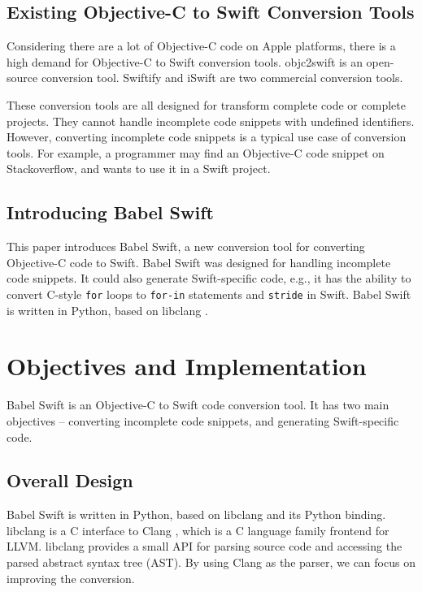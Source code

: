 \documentclass{sfuthesis}
\begin{document}
\section{Existing Objective-C to Swift Conversion Tools}

Considering there are a lot of Objective-C code on Apple platforms, there is a high demand for Objective-C to Swift conversion tools. objc2swift \cite{objc2swift} is an open-source conversion tool. Swiftify \cite{swiftify} and iSwift \cite{iswift} are two commercial conversion tools.

These conversion tools are all designed for transform complete code or complete projects. They cannot handle incomplete code snippets with undefined identifiers. However, converting incomplete code snippets is a typical use case of conversion tools. For example, a programmer may find an Objective-C code snippet on Stackoverflow, and wants to use it in a Swift project.

\section{Introducing Babel Swift}

This paper introduces Babel Swift, a new conversion tool for converting Objective-C code to Swift. Babel Swift was designed for handling incomplete code snippets. It could also generate Swift-specific code, e.g., it has the ability to convert C-style \texttt{for} loops to \texttt{for-in} statements and \texttt{stride} in Swift. Babel Swift is written in Python, based on libclang \cite{libclang}.


\chapter{Objectives and Implementation}

Babel Swift is an Objective-C to Swift code conversion tool. It has two main objectives -- converting incomplete code snippets, and generating Swift-specific code.

\section{Overall Design}

Babel Swift is written in Python, based on libclang \cite{libclang} and its Python binding. libclang is a C interface to Clang \cite{clang}, which is a C language family frontend for LLVM. libclang provides a small API for parsing source code and accessing the parsed abstract syntax tree (AST). By using Clang as the parser, we can focus on improving the conversion.
\end{document}
